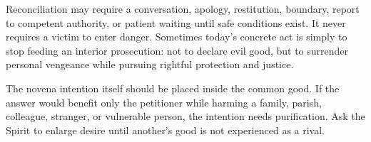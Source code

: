 Reconciliation may require a conversation, apology, restitution, boundary, report to competent authority, or patient waiting until safe conditions exist. It never requires a victim to enter danger. Sometimes today's concrete act is simply to stop feeding an interior prosecution: not to declare evil good, but to surrender personal vengeance while pursuing rightful protection and justice.

The novena intention itself should be placed inside the common good. If the answer would benefit only the petitioner while harming a family, parish, colleague, stranger, or vulnerable person, the intention needs purification. Ask the Spirit to enlarge desire until another's good is not experienced as a rival.




